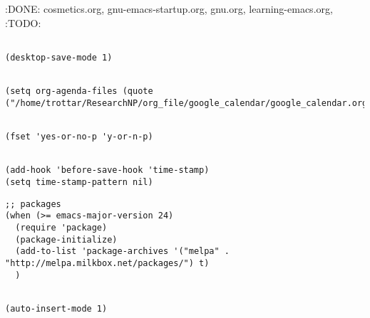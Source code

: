 \documentclass[11pt]{article}
\author{Richard Trotta}
\date{\today}
\title{}
\begin{document}
\tableofcontents

:DONE: cosmetics.org, gnu-emacs-startup.org, gnu.org, learning-emacs.org, 
:TODO: 
\label{sec:org484c3c2}

\begin{verbatim}

(desktop-save-mode 1)

\end{verbatim}

\label{sec:orgcf0512f}
\begin{verbatim}

(setq org-agenda-files (quote ("/home/trottar/ResearchNP/org_file/google_calendar/google_calendar.org")))

\end{verbatim}
\label{sec:org2fd8a33}

\begin{verbatim}

(fset 'yes-or-no-p 'y-or-n-p)

\end{verbatim}

\label{sec:orgdbbbc41}

\begin{verbatim}

(add-hook 'before-save-hook 'time-stamp)
(setq time-stamp-pattern nil)

\end{verbatim}

\label{sec:org6d476d7}
\begin{verbatim}
;; packages
(when (>= emacs-major-version 24)
  (require 'package)
  (package-initialize)
  (add-to-list 'package-archives '("melpa" . "http://melpa.milkbox.net/packages/") t)
  )
\end{verbatim}
\label{sec:org267c164}

\begin{verbatim}

(auto-insert-mode 1)

\end{verbatim}

\label{sec:org94e89e7}
\end{document}
